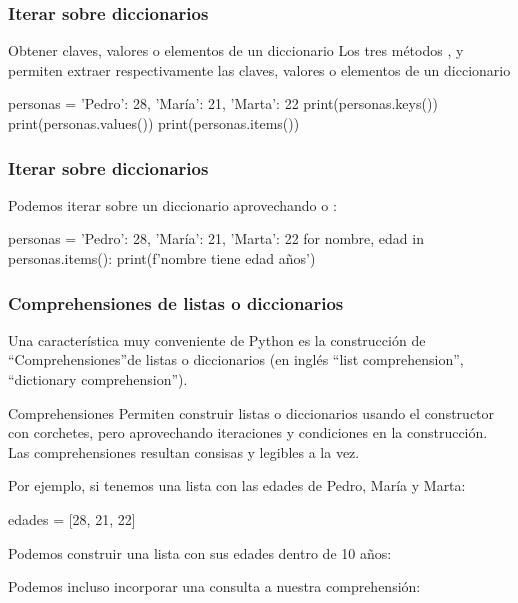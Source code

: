 \documentclass[handout,9pt]{beamer}
\begin{document}
\begin{frame}[fragile]
  \frametitle{Iterar sobre diccionarios}
  \begin{block}{Obtener claves, valores o elementos de un diccionario}
    Los tres métodos ,  y  permiten
    extraer respectivamente las claves, valores o elementos de un
    diccionario
  \end{block}
    \begin{pyconsole}
personas = {
   'Pedro': 28,
   'María': 21,
   'Marta': 22
}
print(personas.keys())
print(personas.values())
print(personas.items())
    \end{pyconsole}

\end{frame}

\begin{frame}[fragile]
  \frametitle{Iterar sobre diccionarios}
  Podemos iterar sobre un diccionario aprovechando  o
  :

  \begin{pyconsole}
personas = {
   'Pedro': 28,
   'María': 21,
   'Marta': 22
}
for nombre, edad in personas.items():
    print(f'{nombre} tiene {edad} años')

  \end{pyconsole}

  \end{frame}
  

\begin{frame}[fragile]
  \frametitle{Comprehensiones de listas o diccionarios}
Una característica muy conveniente de Python es la construcción de
``Comprehensiones''de listas o diccionarios (en inglés ``list
comprehension'', ``dictionary comprehension'').

\begin{block}{Comprehensiones}
  Permiten construir listas o diccionarios usando el constructor con
  corchetes, pero aprovechando iteraciones y condiciones en la
  construcción. Las comprehensiones resultan consisas y legibles a la vez.
  
\end{block}
Por ejemplo, si tenemos una lista con las edades de Pedro, María y
Marta:
\begin{pyconsole}
edades = [28, 21, 22]
\end{pyconsole}
Podemos construir una lista con sus edades dentro de 10 años:
\begin{pyconsole}
\end{pyconsole}
Podemos incluso incorporar una consulta a nuestra comprehensión:

\begin{pyconsole}
\end{pyconsole}
  \end{frame}
\end{document}
